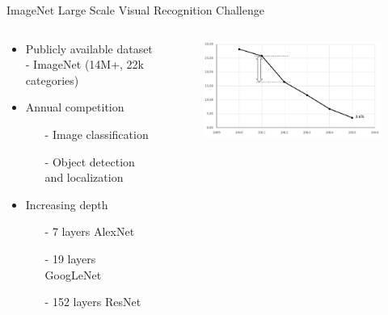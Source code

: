\begin{frame}{ImageNet Large Scale Visual Recognition Challenge}

\begin{columns}
	\begin{column}{.5\textwidth}
		\begin{itemize}
			\item Publicly available dataset - ImageNet (14M+, 22k categories)
			\item Annual competition 
			\begin{itemize}
				\item[-] Image classification 
				\item[-] Object detection and localization
			\end{itemize}
			\item Increasing depth 
			\begin{itemize}
				\item[-] 7 layers AlexNet
				\item[-] 19 layers  GoogLeNet
				\item[-] 152 layers ResNet 
			\end{itemize}
 
		\end{itemize}
	\end{column}
	\begin{column}{.5\textwidth}
		\begin{figure}
			\includegraphics[width=1.2\textwidth, center]{figures/ilsvrc_2015_plot}
		\end{figure}
	\end{column}
\end{columns}

 
\end{frame}
